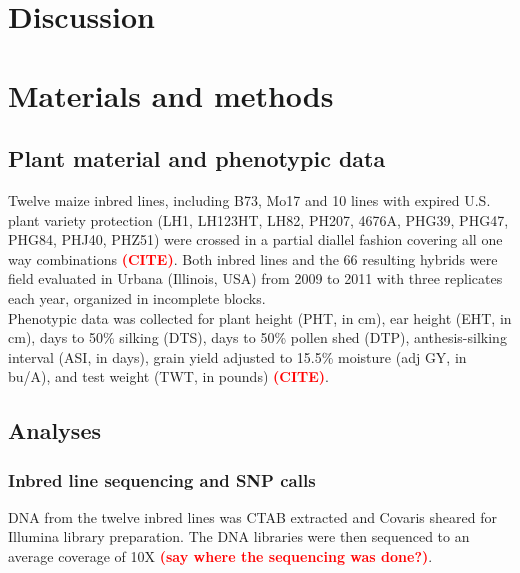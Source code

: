 \documentclass[10pt]{article}
\newcommand{\sme}[1]{\textcolor{red}{\bf #1}}
\begin{document}
\section*{Discussion}







\section*{Materials and methods}

\subsection*{Plant material and phenotypic data}
Twelve maize inbred lines, including B73, Mo17 and 10 lines with expired U.S. plant variety protection (LH1, LH123HT, LH82, PH207, 4676A, PHG39, PHG47, PHG84, PHJ40, PHZ51) were crossed in a partial diallel fashion covering all one way combinations \sme{(CITE)}. 
 Both inbred lines and the 66 resulting hybrids were field evaluated in Urbana (Illinois, USA) from 2009 to 2011 with three replicates each year, organized in incomplete blocks.\\
Phenotypic data was collected for plant height (PHT, in cm), ear height (EHT, in cm), days to 50\% silking (DTS), days to 50\% pollen shed (DTP), anthesis-silking interval (ASI, in days), grain yield adjusted to 15.5\% moisture (adj GY, in bu/A), and test weight (TWT, in pounds) \sme{(CITE)}.%

\subsection*{Analyses}

\subsubsection*{Inbred line sequencing and SNP calls}

DNA from the twelve inbred lines was CTAB extracted \citep{Doyle1987} and Covaris sheared for Illumina library preparation. The DNA libraries were then sequenced to an average coverage of 10X \sme{(say where the sequencing was done?)}.
\end{document}
